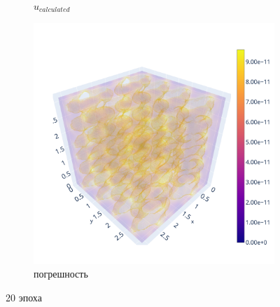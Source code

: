\documentclass[a4paper,hidelinks,12pt]{article}
\begin{document}
\begin{figure}[H]
\begin{subfigure}{.33\textwidth}
  \caption{$u_{calculated}$}
\end{subfigure}%
\begin{subfigure}{.33\textwidth}
  \centering
  \includegraphics[width=\linewidth]{pictures/19_Lpi_128_diff.png}
  \caption{погрешность}
\end{subfigure}%
\caption{20 эпоха}
\label{fig:fig}
\end{figure}
\end{document}
